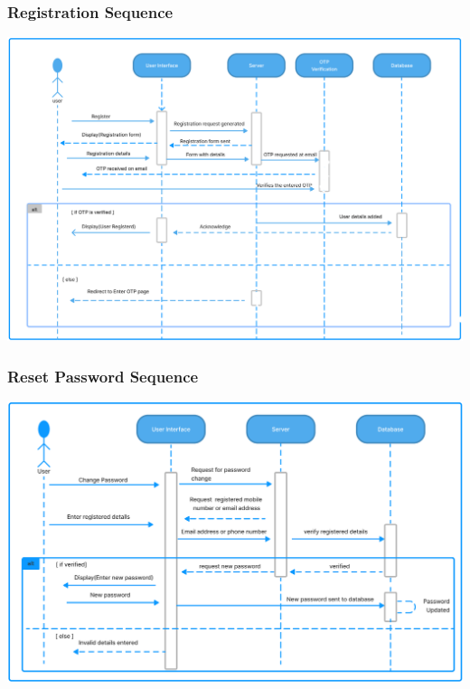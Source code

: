 \documentclass[11pt]{article}
\begin{document}
\subsubsection{Registration Sequence}
\begin{center}
  \includegraphics[scale=0.3]{sequence-diagram-images/register.png}
\end{center}

\subsubsection{Reset Password Sequence}
\begin{center}
  \includegraphics[scale=0.35]{sequence-diagram-images/reset_password.png}
\end{center}
\end{document}

